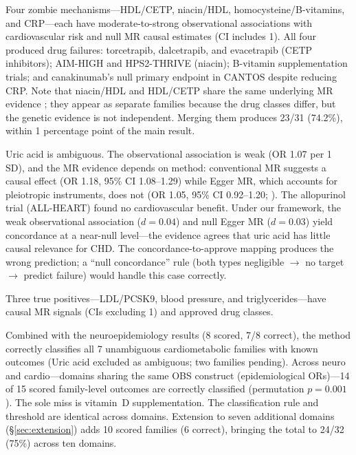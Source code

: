 \documentclass[11pt]{article}
\begin{document}
Four zombie mechanisms---HDL/CETP, niacin/HDL, homocysteine/B-vitamins, and CRP---each have moderate-to-strong observational associations with cardiovascular risk and null MR causal estimates (CI includes 1). All four produced drug failures: torcetrapib, dalcetrapib, and evacetrapib (CETP inhibitors); AIM-HIGH and HPS2-THRIVE (niacin); B-vitamin supplementation trials; and canakinumab's null primary endpoint in CANTOS despite reducing CRP. Note that niacin/HDL and HDL/CETP share the same underlying MR evidence \cite{voight2012}; they appear as separate families because the drug classes differ, but the genetic evidence is not independent. Merging them produces 23/31 (74.2\%), within 1 percentage point of the main result.

Uric acid is ambiguous. The observational association is weak (OR 1.07 per 1 SD), and the MR evidence depends on method: conventional MR suggests a causal effect (OR 1.18, 95\% CI 1.08--1.29) while Egger MR, which accounts for pleiotropic instruments, does not (OR 1.05, 95\% CI 0.92--1.20; \cite{white2016}). The allopurinol trial (ALL-HEART) found no cardiovascular benefit. Under our framework, the weak observational association ($d = 0.04$) and null Egger MR ($d = 0.03$) yield concordance at a near-null level---the evidence agrees that uric acid has little causal relevance for CHD. The concordance-to-approve mapping produces the wrong prediction; a ``null concordance'' rule (both types negligible $\to$ no target $\to$ predict failure) would handle this case correctly.

Three true positives---LDL/PCSK9, blood pressure, and triglycerides---have causal MR signals (CIs excluding 1) and approved drug classes.

Combined with the neuroepidemiology results (8 scored, 7/8 correct), the method correctly classifies all 7 unambiguous cardiometabolic families with known outcomes (Uric acid excluded as ambiguous; two families pending). Across neuro and cardio---domains sharing the same OBS construct (epidemiological ORs)---14 of 15 scored family-level outcomes are correctly classified (permutation $p = 0.001$). The sole miss is vitamin~D supplementation. The classification rule and threshold are identical across domains. Extension to seven additional domains (\S\ref{sec:extension}) adds 10 scored families (6 correct), bringing the total to 24/32 (75\%) across ten domains.
\end{document}
